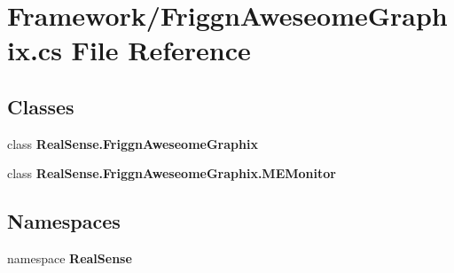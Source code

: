 \section{Framework/\+Friggn\+Aweseome\+Graphix.cs File Reference}
\label{_friggn_aweseome_graphix_8cs}
\subsection*{Classes}
\begin{DoxyCompactItemize}
\item 
class \textbf{ Real\+Sense.\+Friggn\+Aweseome\+Graphix}
\item 
class \textbf{ Real\+Sense.\+Friggn\+Aweseome\+Graphix.\+M\+E\+Monitor}
\end{DoxyCompactItemize}
\subsection*{Namespaces}
\begin{DoxyCompactItemize}
\item 
namespace \textbf{ Real\+Sense}
\end{DoxyCompactItemize}
